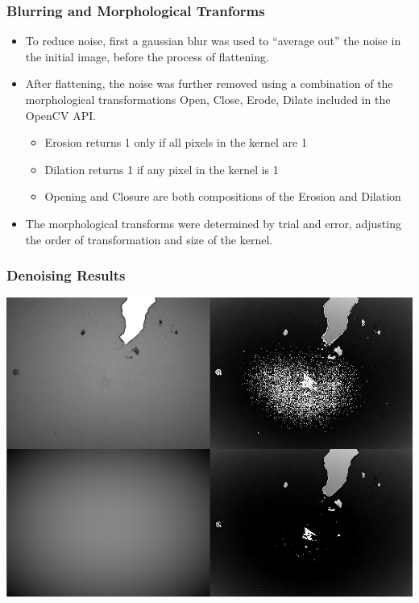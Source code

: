 \documentclass{beamer}
\begin{document}
\begin{frame}
	\frametitle{Blurring and Morphological Tranforms}
	\begin{itemize}
		\item<1->To reduce noise, first a gaussian blur was used to ``average out'' the noise in the initial image, before the process of flattening.
		\item<2->After flattening, the noise was further removed using a combination of the morphological transformations Open, Close, Erode, Dilate included in the OpenCV API.
		\begin{itemize}
			\item<3-> Erosion returns 1 only if all pixels in the kernel are 1
			\item<4-> Dilation returns 1 if any pixel in the kernel is 1
			\item<5-> Opening and Closure are both compositions of the Erosion and Dilation
		\end{itemize}
		\item<6-> The morphological transforms were determined by trial and error, adjusting the order of transformation and size of the kernel.
	\end{itemize}
\end{frame}

\begin{frame}
	\frametitle{Denoising Results}
	\begin{center}
		\includegraphics[scale = 0.3]{image/morph1.png}
	\end{center}
\end{frame}
\end{document}
